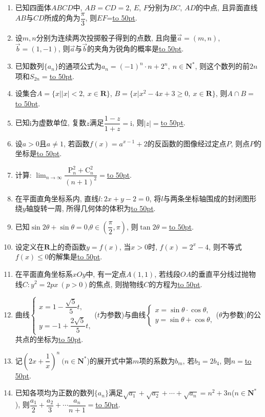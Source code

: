 \documentclass[10pt,a4paper]{article}
\newcommand{\blank}[1]{\underline{\hbox to #1pt{}}}
\begin{document}
\begin{enumerate}[1.]
\begin{center}
\end{center}
\item 已知四面体$ABCD$中, $AB=CD=2$, $E$, $F$分别为$BC$, $AD$的中点, 且异面直线$AB$与$CD$所成的角为$\dfrac{\pi}3$, 则$EF$=\blank{50}.  
\item 设$m,n$分别为连续两次投掷骰子得到的点数, 且向量$\overrightarrow a=(m,n)$,$\overrightarrow b=(1,-1)$, 则$\overrightarrow a$与$\overrightarrow b$的夹角为锐角的概率是\blank{50}.
\item 已知数列$\{a_n\}$的通项公式为$a_n={(-1)}^n\cdot n+2^n, \ n\in \mathbf{N}^*$, 则这个数列的前$2n$项和$S_{2n}=$\blank{50}.  


\item 设集合$A=\{x||x|<2,\ x\in \mathbf{R}\}$, $B=\{x|x^2-4x+3\ge 0, \ x\in \mathbf{R}\}$, 则$A\cap B=$\blank{50}.
\item 已知$\mathrm{i}$为虚数单位, 复数$z$满足$\dfrac{1-z}{1+z}=\mathrm{i}$, 则$|z|=$\blank{50}.
\item 设$a>0$且$a\ne 1$, 若函数$f(x)=a^{x-1}+2$的反函数的图像经过定点$P$, 则点$P$的坐标是\blank{50}.
\item 计算: $\displaystyle\lim_{n\to\infty}\dfrac{\mathrm{P}_n^2+\mathrm{C}_n^2}{(n+1)^2}=$\blank{50}.
\item 在平面直角坐标系内, 直线$l:2x+y-2=0$, 将$l$与两条坐标轴围成的封闭图形绕$y$轴旋转一周, 所得几何体的体积为\blank{50}.
\item 已知$\sin 2\theta +\sin\theta =0$,$\theta \in (\dfrac{\pi}2,\pi)$, 则$\tan 2\theta =$\blank{50}.
\item 设定义在$\mathbf{R}$上的奇函数$y=f(x)$, 当$x>0$时, $f(x)=2^x-4$, 则不等式$f(x)\le 0$的解集是\blank{50}.
\item 在平面直角坐标系$xOy$中, 有一定点$A(1,1)$, 若线段$OA$的垂直平分线过抛物线$C:y^2=2px \ (p>0)$的焦点, 则抛物线$C$的方程为\blank{50}.
\item 曲线$\begin{cases} x=1-\dfrac{\sqrt5}5 t, \\ y=-1+\dfrac{2\sqrt5}5t, \end{cases}$($t$为参数)与曲线$\begin{cases} x=\sin \theta \cdot \cos \theta, \\ y=\sin \theta +\cos \theta,  \end{cases}$($\theta$为参数)的公共点的坐标为\blank{50}.
\item 记$(2x+\dfrac1x)^n \ (n\in \mathbf{N}^*$)的展开式中第$m$项的系数为$b_m$, 若$b_3=2b_4$, 则$n=$\blank{50}.
\item 已知各项均为正数的数列$\{a_n\}$满足$\sqrt{a_1}+\sqrt{a_2}+\cdots+\sqrt{a_n}=n^2+3n$($n\in \mathbf{N}^*$), 则$\dfrac{a_1}2+\dfrac{a_2}3+\cdots \dfrac{a_n}{n+1}=$\blank{50}.


\end{enumerate}
\end{document}
